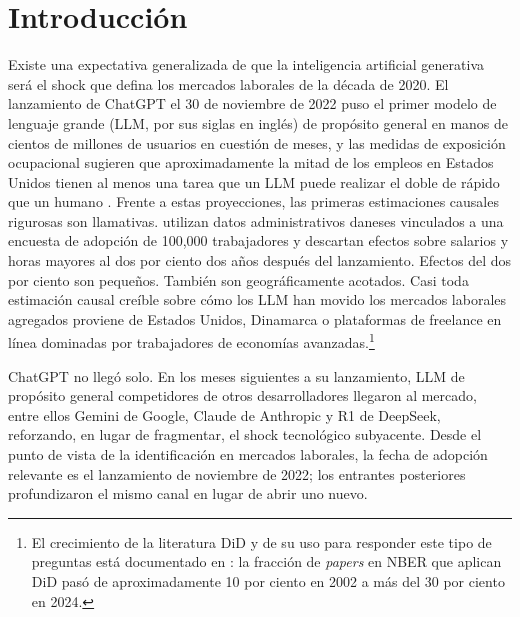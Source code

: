 \section{Introducci\'{o}n}
\label{sec:introduction}

Existe una expectativa generalizada de que la inteligencia artificial generativa ser\'{a} el shock que defina los mercados laborales de la d\'{e}cada de 2020. El lanzamiento de ChatGPT el 30 de noviembre de 2022 puso el primer modelo de lenguaje grande (LLM, por sus siglas en ingl\'{e}s) de prop\'{o}sito general en manos de cientos de millones de usuarios en cuesti\'{o}n de meses, y las medidas de exposici\'{o}n ocupacional sugieren que aproximadamente la mitad de los empleos en Estados Unidos tienen al menos una tarea que un LLM puede realizar el doble de r\'{a}pido que un humano \citep{Eloundou2023_gpt_exposure}. Frente a estas proyecciones, las primeras estimaciones causales rigurosas son llamativas. \citet{HumlumVestergaard2025_llm} utilizan datos administrativos daneses vinculados a una encuesta de adopci\'{o}n de 100{,}000 trabajadores y descartan efectos sobre salarios y horas mayores al dos por ciento dos a\~{n}os despu\'{e}s del lanzamiento. Efectos del dos por ciento son peque\~{n}os. Tambi\'{e}n son geogr\'{a}ficamente acotados. Casi toda estimaci\'{o}n causal cre\'{i}ble sobre c\'{o}mo los LLM han movido los mercados laborales agregados proviene de Estados Unidos, Dinamarca o plataformas de freelance en l\'{i}nea dominadas por trabajadores de econom\'{i}as avanzadas.\footnote{El crecimiento de la literatura DiD y de su uso para responder este tipo de preguntas est\'{a} documentado en \citet{GoldsmithPinkham2024_credibility}: la fracci\'{o}n de \emph{papers} en NBER que aplican DiD pas\'{o} de aproximadamente 10 por ciento en 2002 a m\'{a}s del 30 por ciento en 2024.}

ChatGPT no lleg\'{o} solo. En los meses siguientes a su lanzamiento, LLM de prop\'{o}sito general competidores de otros desarrolladores llegaron al mercado, entre ellos Gemini de Google, Claude de Anthropic y R1 de DeepSeek, reforzando, en lugar de fragmentar, el shock tecnol\'{o}gico subyacente. Desde el punto de vista de la identificaci\'{o}n en mercados laborales, la fecha de adopci\'{o}n relevante es el lanzamiento de noviembre de 2022; los entrantes posteriores profundizaron el mismo canal en lugar de abrir uno nuevo.

